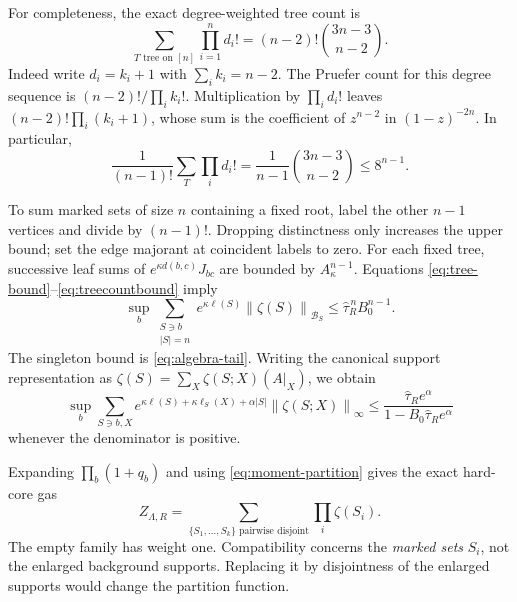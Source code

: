 \documentclass[11pt]{article}
\newcommand{\Bcal}{\mathcal B}
\newcommand{\norm}[1]{\left\|#1\right\|}
\begin{document}
For completeness, the exact degree-weighted tree count is
\begin{equation}
 \sum_{T\text{ tree on }[n]}\prod_{i=1}^n d_i!
       =(n-2)!\binom{3n-3}{n-2}.                         \label{eq:treecount}
\end{equation}
Indeed write $d_i=k_i+1$ with $\sum_i k_i=n-2$.
The Pruefer count for this degree sequence is
$(n-2)!/\prod_i k_i!$.
Multiplication by $\prod_i d_i!$ leaves
$(n-2)!\prod_i(k_i+1)$, whose sum is the coefficient of
$z^{n-2}$ in $(1-z)^{-2n}$.
In particular,
\begin{equation}
 \frac1{(n-1)!}\sum_T\prod_i d_i!
       =\frac1{n-1}\binom{3n-3}{n-2}\le8^{n-1}.           \label{eq:treecountbound}
\end{equation}

To sum marked sets of size $n$ containing a fixed root, label the other
$n-1$ vertices and divide by $(n-1)!$. Dropping distinctness only
increases the upper bound; set the edge majorant at coincident labels
to zero. For each fixed tree, successive leaf sums of
$e^{\kappa d(b,c)}J_{bc}$ are bounded by $A_\kappa^{n-1}$.
Equations \eqref{eq:tree-bound}--\eqref{eq:treecountbound} imply
\begin{equation}
 \sup_b\sum_{\substack{S\ni b\\|S|=n}}
             e^{\kappa\ell(S)}\norm{\zeta(S)}_{\Bcal_S}
           \le\widehat\tau_R^{\,n}B_0^{n-1}.
 \label{eq:anchored-n}
\end{equation}
The singleton bound is \eqref{eq:algebra-tail}.
Writing the canonical support representation as
$\zeta(S)=\sum_X\zeta(S;X)(A|_X)$, we obtain
\begin{equation}
 \sup_b\sum_{S\ni b,X}
 e^{\kappa\ell(S)+\kappa\ell_S(X)+\alpha|S|}
                       \norm{\zeta(S;X)}_\infty
 \le
 \frac{\widehat\tau_Re^\alpha}
      {1-B_0\widehat\tau_Re^\alpha}
 \label{eq:polymernorm}
\end{equation}
whenever the denominator is positive.

Expanding $\prod_b(1+q_b)$ and using \eqref{eq:moment-partition}
gives the exact hard-core gas
\begin{equation}
 Z_{\Lambda,R}
  =\sum_{\{S_1,\ldots,S_k\}\text{ pairwise disjoint}}
                            \prod_i\zeta(S_i).
 \label{eq:gas}
\end{equation}
The empty family has weight one. Compatibility concerns the
\emph{marked sets} $S_i$, not the enlarged background supports.
Replacing it by disjointness of the enlarged supports would change
the partition function.
\end{document}
